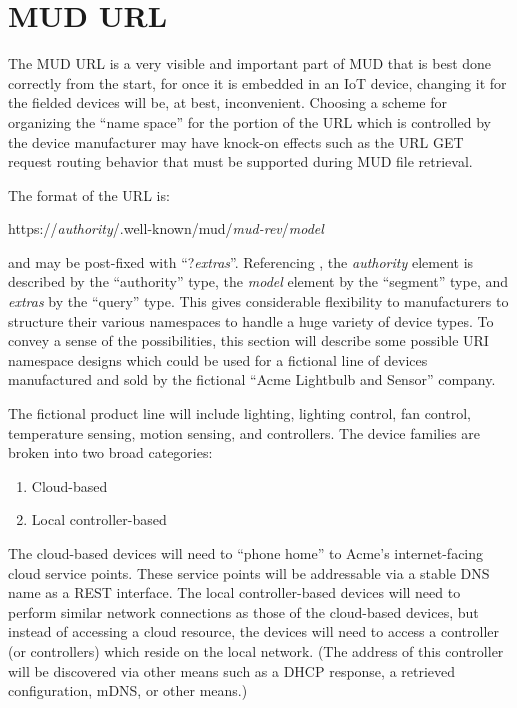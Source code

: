 \documentclass[conference]{IEEEtran}
\begin{document}
\section{MUD URL}

The MUD URL is a very visible and important part of MUD that is best
done correctly from the start, for once it is embedded in an IoT
device, changing it for the fielded devices will be, at best,
inconvenient.  Choosing a scheme for organizing the ``name space'' for
the portion of the URL which is controlled by the device manufacturer
may have knock-on effects such as the URL GET request routing behavior
that must be supported during MUD file retrieval.

The format of the URL is:

\begin{center}
  \ttfamily\scriptsize
  https://{\em authority}/.well-known/mud/{\em mud-rev}/{\em model}
\end{center}
and may be post-fixed with ``{\ttfamily\small ?{\em extras}}''.
Referencing \cite{ietf:rfc3986}, the {\em authority} element is
described by the ``authority'' type, the {\em model} element by the
``segment'' type, and {\em extras} by the ``query'' type.  This gives
considerable flexibility to manufacturers to structure their various
namespaces to handle a huge variety of device types.  To convey a
sense of the possibilities, this section will describe some possible
URI namespace designs which could be used for a fictional line of
devices manufactured and sold by the fictional ``Acme Lightbulb and
Sensor'' company.

The fictional product line will include lighting, lighting control,
fan control, temperature sensing, motion sensing, and controllers.
The device families are broken into two broad categories:
\begin{enumerate}
\item Cloud-based
\item Local controller-based
\end{enumerate}
The cloud-based devices will need to ``phone home'' to Acme's
internet-facing cloud service points.  These service points will be
addressable via a stable DNS name as a REST interface.  The local
controller-based devices will need to perform similar network
connections as those of the cloud-based devices, but instead of
accessing a cloud resource, the devices will need to access a
controller (or controllers) which reside on the local network.  (The
address of this controller will be discovered via other means such as
a DHCP response, a retrieved configuration, mDNS, or other means.)
\end{document}
